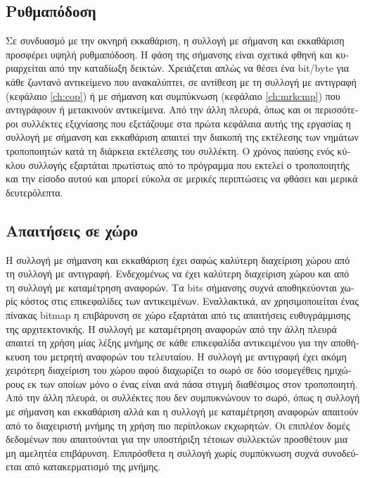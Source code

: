 \begin{greek}
\subsection{Ρυθμαπόδοση}
Σε συνδυασμό με την οκνηρή εκκαθάριση, η συλλογή με σήμανση και
εκκαθάριση προσφέρει υψηλή ρυθμαπόδοση. Η φάση της σήμανσης είναι
σχετικά φθηνή και κυριαρχείται από την καταδίωξη δεικτών. Χρειάζεται
απλώς να θέσει ένα bit/byte για κάθε ζωντανό αντικείμενο που
ανακαλύπτει, σε αντίθεση με τη συλλογή με αντιγραφή (κεφάλαιο
\ref{ch:cop}) ή με σήμανση και συμπύκνωση (κεφάλαιο \ref{ch:mrkcmp}) 
που αντιγράφουν ή μετακινούν αντικείμενα. Από την άλλη πλευρά, 
όπως και οι περισσότεροι συλλέκτες εξιχνίασης που εξετάζουμε
στα πρώτα κεφάλαια αυτής της εργασίας η συλλογή με σήμανση και
εκκαθάριση απαιτεί την διακοπή της εκτέλεσης των νημάτων τροποποιητών
κατά τη διάρκεια εκτέλεσης του συλλέκτη. Ο χρόνος παύσης ενός
κύκλου συλλογής εξαρτάται πρωτίστως από το πρόγραμμα που εκτελεί
ο τροποποιητής και την είσοδο αυτού και μπορεί εύκολα σε μερικές
περιπτώσεις να φθάσει και μερικά δευτερόλεπτα.

\subsection{Απαιτήσεις σε χώρο}
Η συλλογή με σήμανση και εκκαθάριση έχει σαφώς καλύτερη διαχείριση
χώρου από τη συλλογή με αντιγραφή. Ενδεχομένως να έχει καλύτερη
διαχείριση χώρου και από τη συλλογή με καταμέτρηση αναφορών. Τα
bits σήμανσης συχνά αποθηκεύονται χωρίς κόστος στις επικεφαλίδες
των αντικειμένων. Εναλλακτικά, αν χρησιμοποιείται ένας πίνακας
bitmap η επιβάρυνση σε χώρο εξαρτάται από τις απαιτήσεις ευθυγράμμισης
της αρχιτεκτονικής. Η συλλογή με καταμέτρηση αναφορών από την
άλλη πλευρά απαιτεί τη χρήση μίας λέξης μνήμης σε κάθε επικεφαλίδα
αντικειμένου για την αποθήκευση του μετρητή αναφορών του τελευταίου.
Η συλλογή με αντιγραφή έχει ακόμη χειρότερη διαχείριση του χώρου
αφού διαχωρίζει το σωρό σε δύο ισομεγέθεις ημιχώρους εκ των οποίων
μόνο ο ένας είναι ανά πάσα στιγμή διαθέσιμος στον τροποποιητή.
Από την άλλη πλευρά, οι συλλέκτες που δεν συμπυκνώνουν το σωρό,
όπως η συλλογή με σήμανση και εκκαθάριση αλλά και η συλλογή με
καταμέτρηση αναφορών απαιτούν από το διαχειριστή μνήμης τη χρήση
πιο περίπλοκων εκχωρητών. Οι επιπλέον δομές δεδομένων που απαιτούνται
για την υποστήριξη τέτοιων συλλεκτών προσθέτουν μια μη αμελητέα
επιβάρυνση. Επιπρόσθετα η συλλογή χωρίς συμπύκνωση συχνά συνοδεύεται
από κατακερματισμό της μνήμης.


\end{greek}
